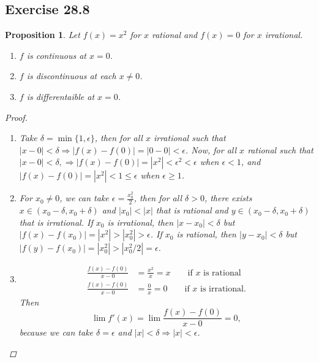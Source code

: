 \documentclass{article}
\newtheorem{proposition}[thm]{Proposition}
\renewcommand*{\implies}{\ensuremath{\Longrightarrow}}
\begin{document}
\newpage
\subsection*{Exercise 28.8}
\begin{proposition}
    Let $f(x)=x^2$ for $x$ rational and $f(x)=0$ for $x$ irrational.
    \begin{enumerate}[label=\textbf{(\alph*)}]
        \item $f$ is continuous at $x=0$.
        \item $f$ is discontinuous at each $x\neq 0$.
        \item $f$ is differentaible at $x=0$.
    \end{enumerate}
    \begin{proof}\indent
        \begin{enumerate}[label=\textbf{(\alph*)}]
            \item Take $\delta = \min\{1, \epsilon\}$, then for all $x$ irrational such that
            $|x-0|<\delta \implies |f(x)-f(0)|=|0-0|<\epsilon$. Now, for all $x$ rational such that 
            $|x-0|<\delta, \implies |f(x)-f(0)|=|x^2| < \epsilon^2<\epsilon$ when $\epsilon <1$, and 
            $|f(x)-f(0)|=|x^2|<1\le \epsilon$ when $\epsilon \ge 1$.

            \item For $x_0\neq 0$, we can take $\epsilon = \frac{x_0^2}{2}$, then for all $\delta>0$,
            there exists $x\in (x_0-\delta, x_0+\delta)$ and $|x_0|<|x|$ that is rational and $y\in (x_0-\delta, x_0+\delta)$ that is
            irrational. If $x_0$ is irrational, then $|x-x_0|<\delta$ but $|f(x)-f(x_0)|=|x^2|>|x_0^2|>\epsilon$.
            If $x_0$ is rational, then $|y-x_0|<\delta$ but $|f(y)-f(x_0)|=|x_0^2|>|x_0^2/2|=\epsilon$.

            \item 
            \begin{align*}
                \frac{f(x)-f(0)}{x-0} & = \frac{x^2}{x} =x \qquad \text{if $x$ is rational} \\
                \frac{f(x)-f(0)}{x-0} & = \frac{0}{x} = 0 \qquad \text{if $x$ is irrational}.
            \end{align*}
            Then $$\lim f'(x) =\lim \frac{f(x)-f(0)}{x-0} = 0,$$
            because we can take $\delta = \epsilon$ and $|x|<\delta\implies |x|<\epsilon$.
        \end{enumerate}
    \end{proof}
\end{proposition}
\end{document}
